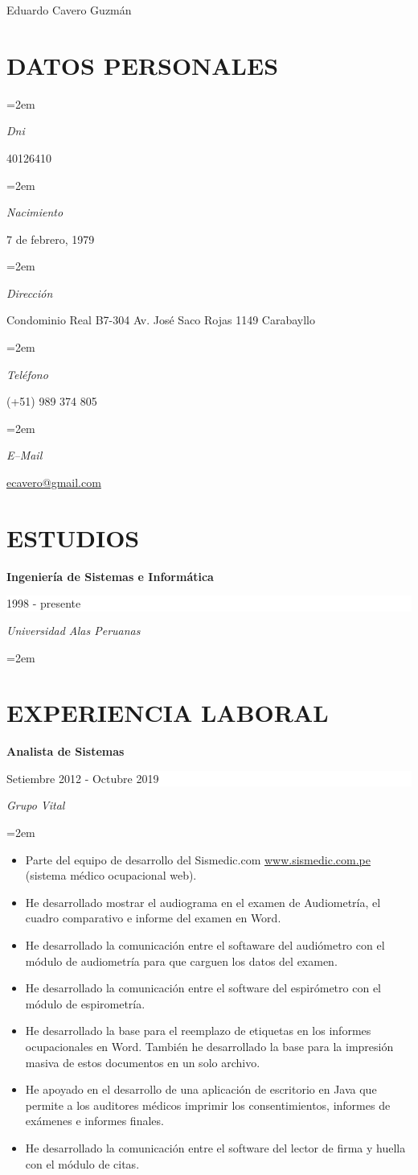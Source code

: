 \documentclass[paper=a4,fontsize=11pt]{scrartcl} %
\newlength{\spacebox}
\newcommand{\sepspace}{\vspace*{1em}}		%
\newcommand{\MyName}[1]{ %
		\Huge \usefont{OT1}{phv}{b}{n} \hfill #1
		\par \normalsize \normalfont}
\newcommand{\NewPart}[1]{\section*{\uppercase{#1}}}
\newcommand{\PersonalEntry}[2]{
		\noindent\hangindent=2em\hangafter=0 %
		\parbox{\spacebox}{        %
		\textit{#1}}		       %
		\hspace{8em} #2 \par}    %
\newcommand{\EducationEntry}[4]{
		\noindent \textbf{#1} \hfill      %
		\colorbox{White}{%
			\parbox{7cm}{%
			\hfill\color{Black}#2}} \par  %
		\noindent \textit{#3} \par        %
		\noindent\hangindent=2em\hangafter=0 \small #4 %
		\normalsize \par}
\begin{document}
\begin{center}
\end{center}


\MyName{Eduardo Cavero Guzmán}
\sepspace

\NewPart{Datos personales}{}

\PersonalEntry{Dni}{40126410}
\PersonalEntry{Nacimiento}{7 de febrero, 1979}
\PersonalEntry{Dirección}{Condominio Real B7-304 Av. José Saco Rojas 1149 Carabayllo}
\PersonalEntry{Teléfono}{(+51) 989 374 805}
\PersonalEntry{E--Mail}{\url{ecavero@gmail.com}}


\NewPart{Estudios}{}

\EducationEntry{Ingeniería de Sistemas e Informática}{1998 - presente}{Universidad Alas Peruanas}{}
\sepspace


\NewPart{Experiencia laboral}{}

\EducationEntry{Analista de Sistemas}{Setiembre 2012 - Octubre 2019}{Grupo Vital}{
\begin{itemize}
\item{Parte del equipo de desarrollo del Sismedic.com \url{www.sismedic.com.pe} (sistema médico ocupacional web).}
\item{He desarrollado mostrar el audiograma en el examen de Audiometría, el cuadro comparativo e informe del examen en Word.}
\item{He desarrollado la comunicación entre el softaware del audiómetro con el módulo de audiometría para que carguen los datos del examen.}
\item{He desarrollado la comunicación entre el software del espirómetro con el módulo de espirometría.}
\item{He desarrollado la base para el reemplazo de etiquetas en los informes ocupacionales en Word. También he desarrollado la base para la impresión masiva de estos documentos en un solo archivo.}
\item{He apoyado en el desarrollo de una aplicación de escritorio en Java que permite a los auditores médicos imprimir los consentimientos, informes de exámenes e informes finales.}
\item{He desarrollado la comunicación entre el software del lector de firma y huella con el módulo de citas.}
\end{itemize}
}
\sepspace
\end{document}
